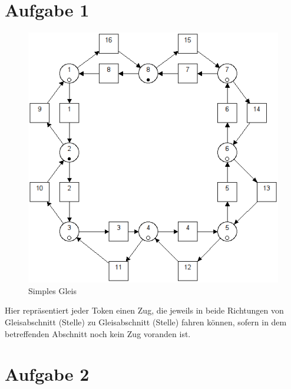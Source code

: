 \documentclass[10pt]{scrartcl}
\author{André Harms, Oliver Steenbuck}
\title{\titletext}
\date{04.04.2012}
\begin{document}
\maketitle

\setcounter{tocdepth}{3}
\tableofcontents

	\listoffigures  
	\lstlistoflistings	

\section{Aufgabe 1}
	\begin{figure}[H]
        \includegraphics[width=\textwidth]{aufgabe1.png}
        \caption{Simples Gleis}
        \label{img:aufg1}
	\end{figure}
	
	Hier repräsentiert jeder Token einen Zug, die jeweils in beide Richtungen von Gleisabschnitt (Stelle) zu Gleisabschnitt (Stelle) fahren können, sofern in dem betreffenden Abschnitt noch kein Zug voranden ist.
	
\section{Aufgabe 2}
\end{document}
